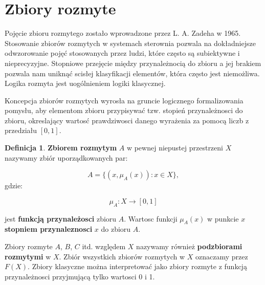 \documentclass[a4paper,12pt]{article}
\theoremstyle{definition}
\newtheorem{df}{Definicja}
\begin{document}

\section{Zbiory rozmyte}

Pojęcie zbioru rozmytego zostało wprowadzone przez L. A. Zadeha w 1965. Stosowanie zbiorów rozmytych w systemach sterownia pozwala na dokładniejsze odwzorowanie pojęć stosowanych przez ludzi, które często są subiektywne i nieprecyzyjne. Stopniowe przejęcie między przynależnocią do zbioru a jej brakiem pozwala nam uniknąć scisłej klasyfikacji elementów, która często jest niemożliwa. Logika rozmyta jest uogólnieniem logiki klasycznej. 

Koncepcja zbiorów rozmytych wyrosła na gruncie logicznego formalizowania pomysłu, aby elementom zbioru przypisywać tzw. stopień przynależnosci do zbioru, okreslający wartosć prawdziwosci danego wyrażenia za pomocą liczb z przedziału $[0,1]$. 

\begin{df}
\textbf{Zbiorem rozmytym} $A$ w pewnej niepustej przestrzeni $X$ nazywamy zbiór uporządkowanych par:

\begin{equation} \label{eq1}
 A  = \{(x, \mu_A(x))\!:x \in X \},
\end{equation}
gdzie:

\begin{equation} \label{eq2}
\mu_A\!:\!X\rightarrow[0, 1] 
\end{equation}

jest \textbf{funkcją przynależosci} zbioru $A$.
Wartosc funkcji $\mu_A(x)$ w punkcie $x$ \textbf{stopniem przynaleznosci} $x$ do zbioru $A$.
\end{df}


Zbiory rozmyte $A$, $B$, $C$ itd. względem $X$ nazywamy również \textbf{podzbiorami rozmytymi} w $X$.
Zbiór wszystkich zbiorów rozmytych w $X$ oznaczamy przez $F(X)$. Zbiory klasyczne można interpretować jako zbiory rozmyte z funkcją przynależnosci przyjmującą tylko wartosci 0 i 1.
\end{document}

